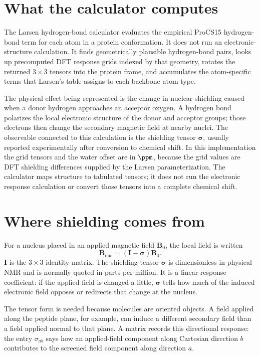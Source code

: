 \documentclass[11pt]{article}
\begin{document}

\section{What the calculator computes}

The Larsen hydrogen-bond calculator evaluates the empirical ProCS15
hydrogen-bond term for each atom in a protein conformation. It does not run an
electronic-structure calculation. It finds geometrically plausible
hydrogen-bond pairs, looks up precomputed DFT response grids indexed by that
geometry, rotates the returned \(3\times 3\) tensors into the protein frame,
and accumulates the atom-specific terms that Larsen's table assigns to each
backbone atom type.

The physical effect being represented is the change in nuclear shielding caused
when a donor hydrogen approaches an acceptor oxygen. A hydrogen bond polarizes
the local electronic structure of the donor and acceptor groups; those
electrons then change the secondary magnetic field at nearby nuclei. The
observable connected to this calculation is the shielding tensor
\(\bm\sigma\), usually reported experimentally after conversion to chemical
shift. In this implementation the grid tensors and the water offset are in
\(\si{\ppm}\), because the grid values are DFT shielding differences supplied
by the Larsen parameterization. The calculator maps structure to tabulated
tensors; it does not run the electronic response calculation or convert those
tensors into a complete chemical shift.

\section{Where shielding comes from}

For a nucleus placed in an applied magnetic field \(\bm B_0\), the local field
is written
\begin{equation}
  \bm B_{\mathrm{nuc}} = (\bm I-\bm\sigma)\bm B_0 .
  \label{eq:shielding}
\end{equation}
\(\bm I\) is the \(3\times 3\) identity matrix. The shielding tensor
\(\bm\sigma\) is dimensionless in physical NMR and is normally quoted in
parts per million. It is a linear-response coefficient: if the applied field is
changed a little, \(\bm\sigma\) tells how much of the induced electronic field
opposes or redirects that change at the nucleus.

The tensor form is needed because molecules are oriented objects. A field
applied along the peptide plane, for example, can induce a different secondary
field than a field applied normal to that plane. A matrix records this
directional response: the entry \(\sigma_{ab}\) says how an applied-field
component along Cartesian direction \(b\) contributes to the screened field
component along direction \(a\).
\end{document}
